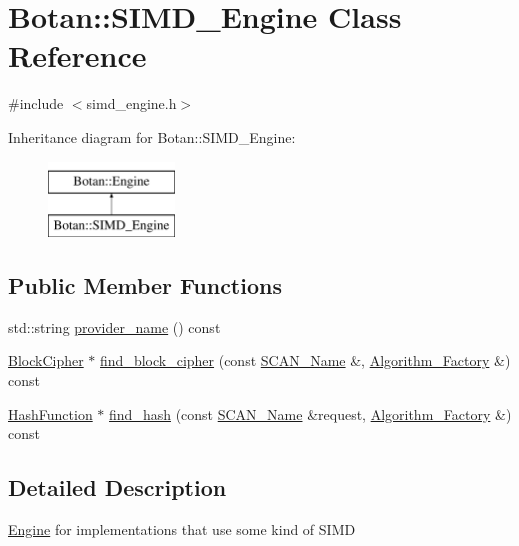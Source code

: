 \hypertarget{classBotan_1_1SIMD__Engine}{\section{Botan\-:\-:S\-I\-M\-D\-\_\-\-Engine Class Reference}
\label{classBotan_1_1SIMD__Engine}
}


{\ttfamily \#include $<$simd\-\_\-engine.\-h$>$}

Inheritance diagram for Botan\-:\-:S\-I\-M\-D\-\_\-\-Engine\-:\begin{figure}[H]
\begin{center}
\leavevmode
\includegraphics[height=2.000000cm]{classBotan_1_1SIMD__Engine}
\end{center}
\end{figure}
\subsection*{Public Member Functions}
\begin{DoxyCompactItemize}
\item 
std\-::string \hyperlink{classBotan_1_1SIMD__Engine_a2ed7c5dea505dc8cf02ffe2a6084562c}{provider\-\_\-name} () const 
\item 
\hyperlink{classBotan_1_1BlockCipher}{Block\-Cipher} $\ast$ \hyperlink{classBotan_1_1SIMD__Engine_a958f9c6062872ae6d582938e1dacf54b}{find\-\_\-block\-\_\-cipher} (const \hyperlink{classBotan_1_1SCAN__Name}{S\-C\-A\-N\-\_\-\-Name} \&, \hyperlink{classBotan_1_1Algorithm__Factory}{Algorithm\-\_\-\-Factory} \&) const 
\item 
\hyperlink{classBotan_1_1HashFunction}{Hash\-Function} $\ast$ \hyperlink{classBotan_1_1SIMD__Engine_af5238393c7e72ed549bf56691fbb390f}{find\-\_\-hash} (const \hyperlink{classBotan_1_1SCAN__Name}{S\-C\-A\-N\-\_\-\-Name} \&request, \hyperlink{classBotan_1_1Algorithm__Factory}{Algorithm\-\_\-\-Factory} \&) const 
\end{DoxyCompactItemize}


\subsection{Detailed Description}
\hyperlink{classBotan_1_1Engine}{Engine} for implementations that use some kind of S\-I\-M\-D 

